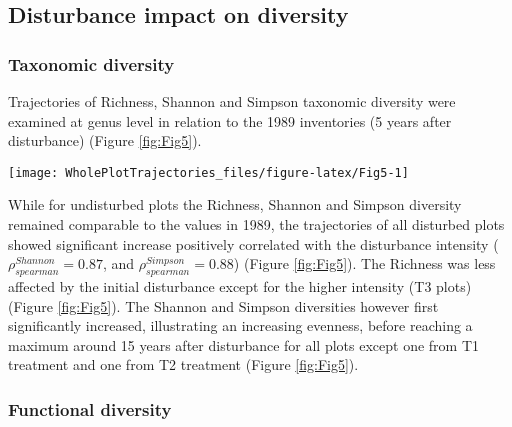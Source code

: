 \documentclass[fleqn,10pt]{ArtEcoFoG} %
\theoremstyle{definition}
\theoremstyle{definition}
\theoremstyle{definition}
\theoremstyle{remark}
\begin{document}
\subsection{Disturbance impact on
diversity}\label{disturbance-impact-on-diversity}

\subsubsection{Taxonomic diversity}\label{taxonomic-diversity}

Trajectories of Richness, Shannon and Simpson taxonomic diversity were
examined at genus level in relation to the 1989 inventories (5 years
after disturbance) (Figure \ref{fig:Fig5}).

\begin{figure*}

{\centering \texttt{[image: WholePlotTrajectories\_files/figure-latex/Fig5-1]} 

}

\caption{Trajectories of the difference to the 1989 inventories (5 years after disturbance) over 30 years after disturbance of plots communities **(a)** Richness, **(b)** Shannon and **(c)** Simpson diversities. Trajectories correspond to the median (solid line) and 0.025 and 0.975 percentile (gray envelope) observed after 50 iteration of the taxonomic uncertainty propagation. Initial treatments are represented by solid lines colors with green for control, blue for T1,orange for T2 and red for T3.}\label{fig:Fig5}
\end{figure*}

While for undisturbed plots the Richness, Shannon and Simpson diversity
remained comparable to the values in 1989, the trajectories of all
disturbed plots showed significant increase positively correlated with
the disturbance intensity (\(\rho_{spearman}^{Shannon}=0.87\), and
\(\rho_{spearman}^{Simpson}=0.88\)) (Figure \ref{fig:Fig5}). The
Richness was less affected by the initial disturbance except for the
higher intensity (T3 plots) (Figure \ref{fig:Fig5}). The Shannon and
Simpson diversities however first significantly increased, illustrating
an increasing evenness, before reaching a maximum around 15 years after
disturbance for all plots except one from T1 treatment and one from T2
treatment (Figure \ref{fig:Fig5}).

\subsubsection{Functional diversity}\label{functional-diversity}
\end{document}
